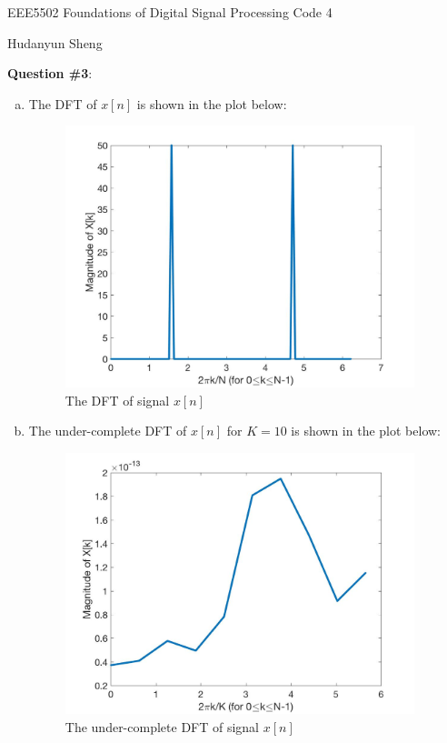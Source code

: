 \documentclass[a4paper]{article}
\begin{document}
\begin{spacing}{2.0}
\begin{flushleft}\begin{huge}EEE5502 Foundations of Digital Signal Processing   Code 4\end{huge}\end{flushleft}
\begin{flushright}\begin{Large} Hudanyun Sheng \end{Large}\end{flushright}

\Large\textbf{ Question \#3}:  \\
\normalsize
\begin{enumerate}[(a)]
\item The DFT of $x[n]$ is shown in the plot below:
\begin{figure} [H]
\centering
\includegraphics[width=4in]{Q3pa.jpg}
\caption{The DFT of signal $x[n]$}
\label{fig:graph}
\end{figure}

\item The under-complete DFT of $x[n]$ for $K=10$ is shown in the plot below: 
\begin{figure}[H]
\centering
\includegraphics[width=4in]{Q3pb.jpg}
\caption{The under-complete DFT of signal $x[n]$}
\label{fig:graph}
\end{figure}


\end{enumerate}
\end{spacing}
\end{document}
